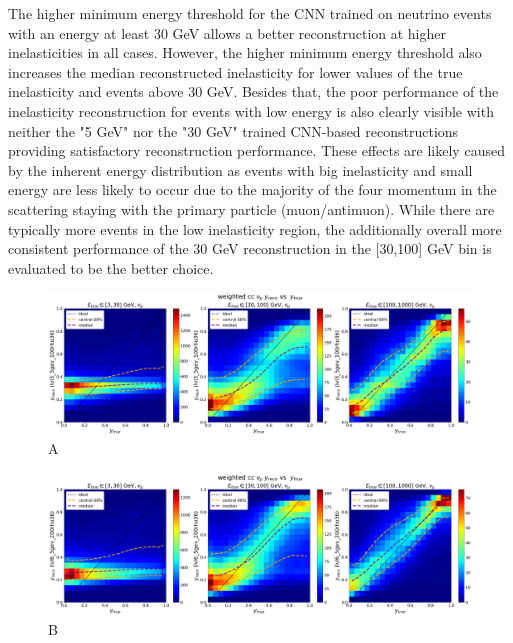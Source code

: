 \documentclass[a4paper,12pt,numbered]{article}
\begin{document}
The higher minimum energy threshold for the CNN trained on neutrino events with an energy at least 30 GeV allows a better reconstruction at higher inelasticities in all cases. However, the higher minimum energy threshold also increases the median reconstructed inelasticity for lower values of the true inelasticity and events above 30 GeV. Besides that, the poor performance of the inelasticity reconstruction for events with low energy is also clearly visible with neither the "5 GeV" nor the "30 GeV" trained CNN-based reconstructions providing satisfactory reconstruction performance. These effects are likely caused by the inherent energy distribution as events with big inelasticity and small energy are less likely to occur due to the majority of the four momentum in the scattering staying with the primary particle (muon/antimuon). While there are typically more events in the low inelasticity region, the additionally overall more consistent performance of the 30 GeV reconstruction in the [30,100] GeV bin is evaluated to be the better choice.

\begin{figure}[H]
\centering
\includegraphics[width=\textwidth]{Graphics/Inelasticity/WithCentral68/weighted/weighted_cc_ytruevsyreco_lvl3_5gev_100rho36_numu.png}
\caption{A}
\end{figure}

\begin{figure}[H]
\centering
\includegraphics[width=\textwidth]{Graphics/Inelasticity/WithCentral68/weighted/weighted_cc_ytruevsyreco_lvl6_5gev_200rho36_numu.png}
\caption{B}
\end{figure}
\end{document}
